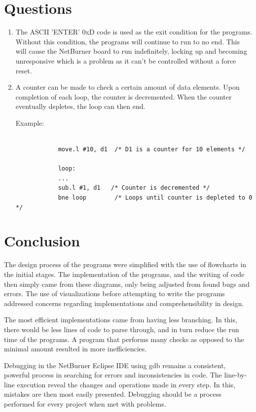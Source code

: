 \documentclass[12pt]{article}
\begin{document}
\section{Questions}
    \begin{enumerate}    \centering


        \item The ASCII 'ENTER' 0xD code is used as the exit condition for the programs. Without this condition, the programs will continue to run to no end. This will cause the NetBurner board to run indefinitely, locking up and becoming unresponsive which is a problem as it can't be controlled without a force reset.
        
        \item A counter can be made to check a certain amount of data elements. Upon completion of each loop, the counter is decremented. When the counter eventually depletes, the loop can then end.
        
        Example:
        \begin{lstlisting}[language={[Motorola68k]Assembler}, style={mystyle}]
           
            move.l #10, d1  /* D1 is a counter for 10 elements */
        
            loop:
            ...
            sub.l #1, d1   /* Counter is decremented */
            bne loop        /* Loops until counter is depleted to 0 */
        \end{lstlisting}
    \end{enumerate}
    
\section{Conclusion}
    The design process of the programs were simplified with the use of flowcharts in the initial stages. The implementation of the programs, and the writing of code then simply came from these diagrams, only being adjusted from found bugs and errors. The use of visualizations before attempting to write the programs addressed concerns regarding implementations and comprehensibility in design.
    
    The most efficient implementations came from having less branching. In this, there would be less lines of code to parse through, and in turn reduce the run time of the programs. A program that performs many checks as opposed to the minimal amount resulted in more inefficiencies.
    
    Debugging in the NetBurner Eclipse IDE using gdb remains a consistent, powerful process in searching for errors and inconsistencies in code. The line-by-line execution reveal the changes and operations made in every step. In this, mistakes are then most easily presented. Debugging should be a process performed for every project when met with problems.
\pagebreak
\end{document}
